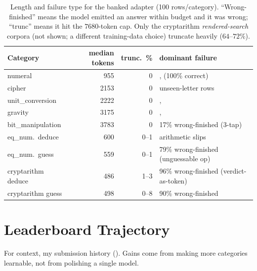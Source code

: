 \documentclass[11pt]{article}
\begin{document}
\begin{table}[htbp]
\centering
\caption{Length and failure type for the banked adapter (100 rows/category). ``Wrong-finished''
means the model emitted an answer within budget and it was wrong; ``trunc'' means it hit the
$7680$-token cap. Only the cryptarithm \emph{rendered-search} corpora (not shown; a different
training-data choice) truncate heavily ($64$--$72\%$).}
\label{tab:tokens}
\small
\begin{tabular}{l r r l}
\toprule
Category & median tokens & trunc.\ \% & dominant failure \\
\midrule
numeral            & 955  & 0   &, (100\% correct) \\
cipher             & 2153 & 0   & unseen-letter rows \\
unit\_conversion   & 2222 & 0   &, \\
gravity            & 3175 & 0   &, \\
bit\_manipulation  & 3783 & 0   & 17\% wrong-finished (3-tap) \\
eq\_num.\ deduce   & 600  & 0--1 & arithmetic slips \\
eq\_num.\ guess    & 559  & 0--1 & 79\% wrong-finished (unguessable op) \\
cryptarithm deduce & 486  & 1--3 & 96\% wrong-finished (verdict-as-token) \\
cryptarithm guess  & 498  & 0--8 & 90\% wrong-finished \\
\bottomrule
\end{tabular}
\end{table}

\section{Leaderboard Trajectory}
\label{app:lbtraj}
For context, my submission history (). Gains come from making more categories
learnable, not from polishing a single model.
\end{document}
